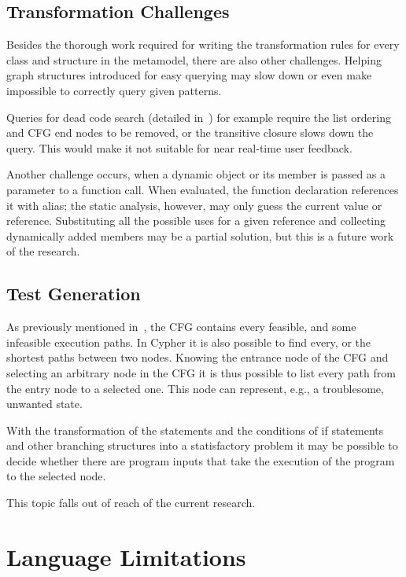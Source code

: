 \subsection{Transformation Challenges}
Besides the thorough work required for writing the transformation rules for every class and structure in the metamodel, there are also other challenges. Helping graph structures introduced for easy querying may slow down or even make impossible to correctly query given patterns.

Queries for dead code search (detailed in~) for example require the list ordering and CFG end nodes to be removed, or the transitive closure slows down the query. This would make it not suitable for near real-time user feedback.

Another challenge occurs, when a dynamic object or its member is passed as a parameter to a function call. When evaluated, the function declaration references it with alias; the static analysis, however, may only guess the current value or reference. Substituting all the possible uses for a given reference and collecting dynamically added members may be a partial solution, but this is a future work of the research.


\subsection{Test Generation}
As previously mentioned in~, the CFG contains every feasible, and some infeasible execution paths. In Cypher it is also possible to find every, or the shortest paths between two nodes. Knowing the entrance node of the CFG and selecting an arbitrary node in the CFG it is thus possible to list every path from the entry node to a selected one. This node can represent, e.g., a troublesome, unwanted state.

With the transformation of the statements and the conditions of if statements and other branching structures into a statisfactory problem it may be possible to decide whether there are program inputs that take the execution of the program to the selected node.

This topic falls out of reach of the current research.

\section{Language Limitations}
